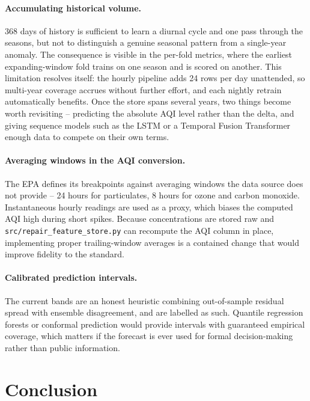 \documentclass[11pt,a4paper]{article}
\begin{document}
\paragraph{Accumulating historical volume.}
368 days of history is sufficient to learn a diurnal cycle and one pass through
the seasons, but not to distinguish a genuine seasonal pattern from a
single-year anomaly. The consequence is visible in the per-fold metrics, where
the earliest expanding-window fold trains on one season and is scored on
another. This limitation resolves itself: the hourly pipeline adds 24 rows per
day unattended, so multi-year coverage accrues without further effort, and each
nightly retrain automatically benefits. Once the store spans several years, two
things become worth revisiting -- predicting the absolute AQI level rather than
the delta, and giving sequence models such as the LSTM or a Temporal Fusion
Transformer enough data to compete on their own terms.

\paragraph{Averaging windows in the AQI conversion.}
The EPA defines its breakpoints against averaging windows the data source does
not provide -- 24 hours for particulates, 8 hours for ozone and carbon
monoxide. Instantaneous hourly readings are used as a proxy, which biases the
computed AQI high during short spikes. Because concentrations are stored raw
and \texttt{src/repair\_feature\_store.py} can recompute the AQI column in
place, implementing proper trailing-window averages is a contained change that
would improve fidelity to the standard.

\paragraph{Calibrated prediction intervals.}
The current bands are an honest heuristic combining out-of-sample residual
spread with ensemble disagreement, and are labelled as such. Quantile
regression forests or conformal prediction would provide intervals with
guaranteed empirical coverage, which matters if the forecast is ever used for
formal decision-making rather than public information.

\section{Conclusion}
\end{document}
